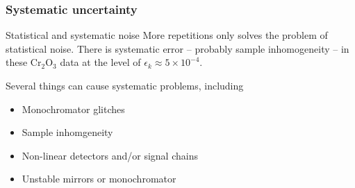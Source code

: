 \documentclass[10pt, xcolor=x11names, compress]{beamer}
\begin{document}
\begin{frame}
  \frametitle{Systematic uncertainty}

  \begin{block}{Statistical and systematic noise}
    More repetitions only solves the problem of statistical noise.
    There is systematic error -- probably sample inhomogeneity -- in
    these Cr$_2$O$_3$ data at the level of $\epsilon_k \approx 5\times
    10^{-4}$.
  \end{block}

  \bigskip

  Several things can cause systematic problems, including
  \begin{itemize}
  \item Monochromator glitches
  \item Sample inhomgeneity
  \item Non-linear detectors and/or signal chains
  \item Unstable mirrors or monochromator
  \end{itemize}
\end{frame}
\end{document}
